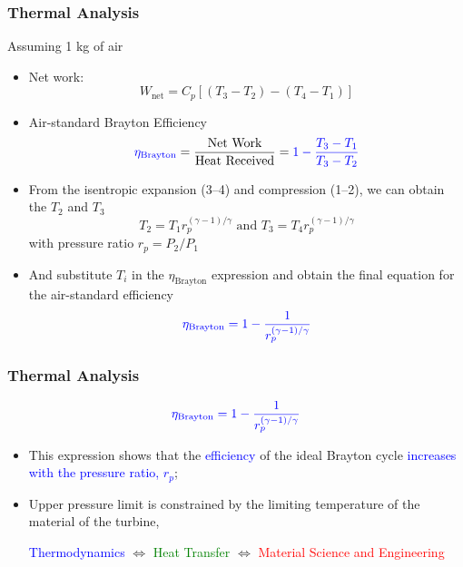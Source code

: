 \documentclass[10pt,compress]{beamer}
\newcommand{\frc}{\displaystyle\frac}
\begin{document}
\begin{frame}
 \frametitle{Thermal Analysis}
   Assuming 1 kg of air
   \begin{itemize}
    \item <1-> Net work: 
     \begin{displaymath}
       W_{\text{net}}=C_{p}\left[\left(T_{3}-T_{2}\right)-\left(T_{4}-T_{1}\right)\right]
     \end{displaymath}

    \item <2-> Air-standard Brayton Efficiency 
      \begin{displaymath}
       \textcolor{blue}{\eta_{\text{Brayton}}}= \frc{\text{Net Work}}{\text{Heat Received}}= \textcolor{blue}{1 - \frc{T_{3}-T_{1}}{T_{3}-T_{2}}}
      \end{displaymath}
    
    \item <3-> From the isentropic expansion (3--4) and compression (1--2), we can obtain the $T_{2}$ and $T_{3}$ 
      \begin{displaymath}
         T_{2} = T_{1} r_{p}^{\left(\gamma-1\right)/\gamma} \text{ and } T_{3} = T_{4}r_{p}^{\left(\gamma-1\right)/\gamma}
      \end{displaymath}
     with pressure ratio $r_{p}=P_{2}/P_{1}$
    \item <4-> And substitute $T_{i}$ in the $\eta_{\text{Brayton}}$ expression and obtain the final equation for the air-standard efficiency
     \begin{displaymath}
       \textcolor{blue}{\eta_{\text{Brayton}} = 1 - \frc{1}{r_{p}^{\left(\gamma-1\right)/\gamma}}}
     \end{displaymath}
   \end{itemize}
\end{frame}



\begin{frame}
 \frametitle{Thermal Analysis}
     \begin{displaymath}
       \textcolor{blue}{\eta_{\text{Brayton}} = 1 - \frc{1}{r_{p}^{\left(\gamma-1\right)/\gamma}}}
     \end{displaymath}
 \begin{itemize}
  \item <1-> This expression shows that the \textcolor{blue}{efficiency} of the ideal Brayton cycle \textcolor{blue}{increases with the pressure ratio, $r_{p}$};
  \item <2-> Upper pressure limit is constrained by the limiting temperature of the material of the turbine,
\begin{center}
\textcolor{blue}{Thermodynamics} $\Longleftrightarrow$ \textcolor{green}{Heat Transfer}  $\Longleftrightarrow$ \textcolor{red}{Material Science and Engineering}
\end{center}
 \end{itemize}
\end{frame}
\end{document}
